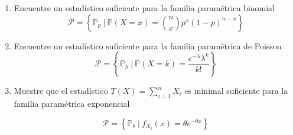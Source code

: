 \documentclass[letterpaper,11pt]{article}
\theoremstyle{plain}
\theoremstyle{definition}
\newcommand{\proba}{\mathbb{P}}
\newcommand{\ds}{\displaystyle}
\newcommand{\1}{\mathbbm{1}}
\begin{document}
\begin{enumerate}[label=\textbf{P{\arabic*}}]


\item Encuentre un estadístico suficiente para la familia paramétrica binomial 
$$\mathcal{P} = \left\{ \proba_{p} \ | \ \proba(X=x) = \binom{n}{x}p^x(1-p)^{n-x} \right\}$$

\item Encuentre un estadístico suficiente para la familia paramétrica de Poisson 
$$\mathcal{P} = \left\{ \proba_{\lambda} \ | \ \proba(X=k) = \frac{e^{-\lambda}\lambda^k}{k!}\right\}$$

\item Muestre que el estadístico $\ds T(X) = \sum_{i=1}^n X_i$ es minimal suficiente para la familia paramétrica exponencial

$$\mathcal{P} = \left\{ \proba_{\theta} \ | \ f_{X_i} (x) = \theta e^{-\theta x}\right\}$$

\end{enumerate}
\end{document}
